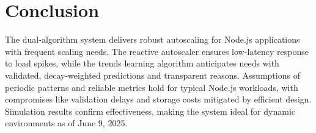 \documentclass[12pt]{article}
\begin{document}
\section{Conclusion}
The dual-algorithm system delivers robust autoscaling for Node.js applications with frequent scaling needs. The reactive autoscaler ensures low-latency response to load spikes, while the trends learning algorithm anticipates needs with validated, decay-weighted predictions and transparent reasons. Assumptions of periodic patterns and reliable metrics hold for typical Node.js workloads, with compromises like validation delays and storage costs mitigated by efficient design. Simulation results confirm effectiveness, making the system ideal for dynamic environments as of June 9, 2025.
\end{document}
